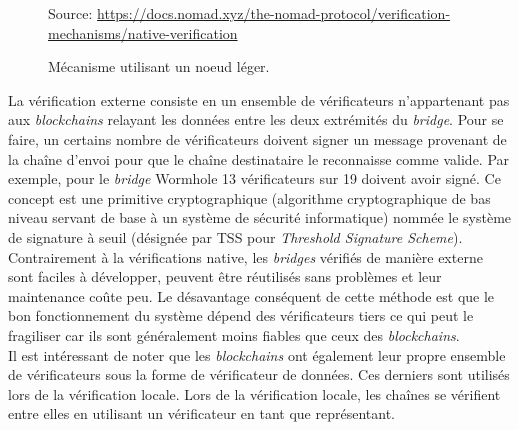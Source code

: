 \begin{figure}[h!]
    \centering
{}
    {\scriptsize
            Source: \url{https://docs.nomad.xyz/the-nomad-protocol/verification-mechanisms/native-verification}}
    \caption{Mécanisme utilisant un noeud léger.}
    \label{fig:LightClient}
\end{figure}

\pagebreak

La vérification externe consiste en un ensemble de \gls{vérificateur}s n’appartenant pas aux \textit{\gls{blockchain}s} relayant les données entre les deux extrémités du \textit{bridge}. Pour se faire, un certains nombre de \gls{vérificateur}s doivent signer un message provenant de la chaîne d’envoi pour que le chaîne destinataire le reconnaisse comme valide. Par exemple, pour le \textit{bridge} Wormhole 13 \gls{vérificateur}s sur 19 doivent avoir signé\cite{NomadDocsExternal}. Ce concept est une primitive cryptographique (algorithme cryptographique de bas niveau servant de base à un système de sécurité informatique) nommée le système de signature à seuil (désignée par TSS pour \textit{Threshold Signature Scheme})\cite{BinanceTSS}. 
Contrairement à la vérifications native, les \textit{bridges} vérifiés de manière externe sont faciles à développer, peuvent être réutilisés sans problèmes et leur maintenance coûte peu. Le désavantage conséquent de cette méthode est que le bon fonctionnement du système dépend des \gls{vérificateur}s tiers ce qui peut le fragiliser car ils sont généralement moins fiables que ceux des \textit{\gls{blockchain}s}. \\

Il est intéressant de noter que les \textit{\gls{blockchain}s} ont également leur propre ensemble de \gls{vérificateur}s sous la forme de \gls{vérificateur} de données. Ces derniers sont utilisés lors de la vérification locale. Lors de la vérification locale, les chaînes se vérifient entre elles en utilisant un \gls{vérificateur} en tant que représentant.

